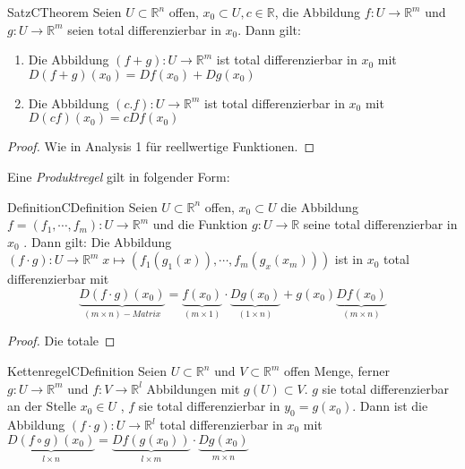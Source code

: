 	\begin{ibox}[33]{Satz}{CTheorem}
	    Seien $ U \subset \mathbb{R}^n  $ offen, $ x_0 \subset U, c \in \mathbb{R}  $, die Abbildung $ f:U \to \mathbb{R}^m $ 
		und $ g:U \to \mathbb{R}^m $ seien total differenzierbar in $ x_0 $. Dann gilt:
		\begin{enumerate}[label=\alph*)]
			\item Die Abbildung $ \left( f+g \right) : U \to \mathbb{R}^m  $ ist total differenzierbar in $ x_0 $ mit 
				$ D \left( f+g \right) (x_0) = Df\left( x_0 \right) + Dg\left( x_0 \right)  $ 
			\item Die Abbildung $ \left( c.f \right) : U \to \mathbb{R}^m $ ist total differenzierbar in $ x_0 $ mit 
				$ D\left( c f \right) (x_0) = c Df(x_0) $ 
		\end{enumerate}
	\end{ibox}
	\begin{proof}
		Wie in Analysis 1 für reellwertige Funktionen. 
	\end{proof}
Eine \textit{Produktregel} gilt in folgender Form:
\begin{ibox}[34]{Definition}{CDefinition}
    Seien $ U \subset \mathbb{R}^n  $ offen, $ x_0 \subset U $ die Abbildung $ f = \left( f_1, \cdots, f_{m} \right) 
	:U \to \mathbb{R}^m$ und die Funktion $ g: U \to \mathbb{R}  $ seine total differenzierbar in $ x_0 $ . Dann gilt:
	Die Abbildung $ \left( f \cdot g \right) : U \to \mathbb{R}^m \; x \mapsto \left( f_1(g_1(x)), \cdots, f_{m}(g_{x}(x_m)) \right) $ 
	ist in $ x_0 $ total differenzierbar mit
	$$
	\underbrace{ D \left( f \cdot g \right) (x_0)}_{(m\times n)-Matrix} =
	\underbrace{f\left( x_0 \right)}_{(m\times 1)} \cdot \underbrace{Dg(x_0)}_{(1\times n)} +
	g(x_0)\underbrace{ Df(x_0)}_{(m\times n )}
	$$
\end{ibox}

\begin{proof}
	Die totale  
\end{proof}

\begin{ibox}[35]{Kettenregel}{CDefinition}
    Seien $ U \subset \mathbb{R}^n \text{ und } V \subset \mathbb{R}^m  $ offen Menge, ferner $ g: U \to \mathbb{R}^m  \text{ und } 
	f:V \to \mathbb{R}^l $ Abbildungen mit $ g(U) \subset V  $. $ g $ sie total differenzierbar an der Stelle $ x_0 \in U $ 
	, $ f $ sie total differenzierbar in $ y_0 = g\left( x_0 \right)  $. Dann ist die Abbildung $ \left( f \cdot g \right) 
	:U \to \mathbb{R}^l  $ total differenzierbar in $ x_0 $ mit $ \underbrace{D \left( f \circ g \right) (x_0) }_{l\times n}= 
	\underbrace{Df(g(x_0))}_{l \times m} \cdot \underbrace{Dg(x_0)}_{m \times n}$ 
\end{ibox}

